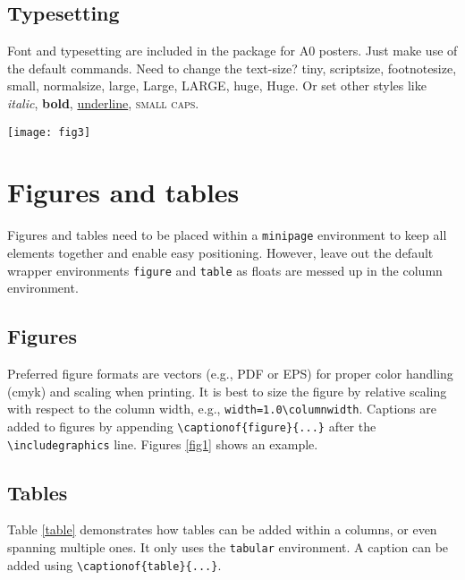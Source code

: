 \documentclass{article}
\begin{document}
\subsection*{Typesetting}
Font and typesetting are included in the package for A0 posters. Just make use of the default \latex commands. Need to change the text-size?
{\tiny tiny}, 
{\scriptsize scriptsize}, 
{\footnotesize footnotesize}, 
{\small small}, 
{\normalsize normalsize}, 
{\large large}, 
{\Large Large}, 
{\LARGE LARGE},
{\huge huge}, 
{\Huge Huge}.
Or set other styles like \textit{italic}, \textbf{bold}, \underline{underline}, \textsc{small caps}.

\pushdown %

\vspace{20pt plus 10pt minus 5pt}
\begin{minipage}[b]{\twocolwidth}
	\begin{center}
	\texttt{[image: fig3]}
	\label{2col-fig}
	\end{center}
\end{minipage}

\columnbreak %

\section*{Figures and tables}
Figures and tables need to be placed within a \verb|minipage| environment to keep all elements together and enable easy positioning.
However, leave out the default \latex wrapper environments \verb|figure| and \verb|table| as floats are messed up in the column environment.

\subsection*{Figures}

Preferred figure formats are vectors (e.g., PDF or EPS) for proper color handling (cmyk) and scaling when printing. It is best to size the figure by relative scaling with respect to the column width, e.g., \verb|width=1.0\columnwidth|.
Captions are added to figures by appending \verb|\captionof{figure}{...}| after the \verb|\includegraphics| line. Figures \ref{fig1} shows an example.

\subsection*{Tables}
Table \ref{table} demonstrates how tables can be added within a columns, or even spanning multiple ones. It only uses the \verb|tabular| environment. A caption can be added using \verb|\captionof{table}{...}|. 
\end{document}
